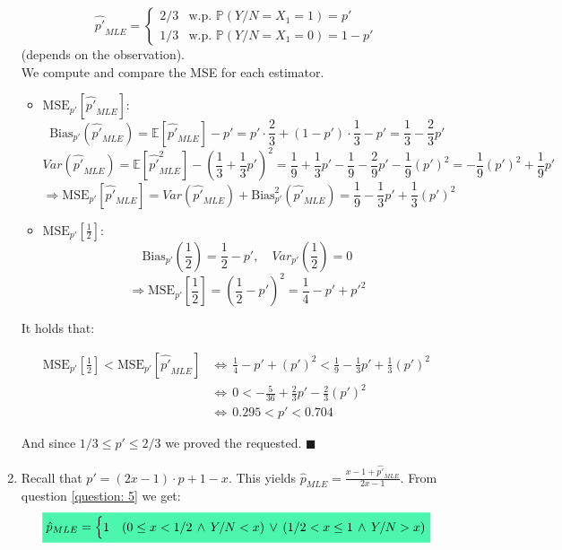\documentclass[../main.tex]{subfiles}
\begin{document}
\begin{enumerate}
    \[\hat{p'}_{MLE}=\begin{cases}
    2/3 & \text{w.p. } \mathbb{P}\left(Y/N=X_1=1\right)=p'\\
    1/3 & \text{w.p. }\mathbb{P}\left(Y/N=X_1=0\right)=1-p'
    \end{cases}\]
    (depends on the observation).\\
    We compute and compare the MSE for each estimator. 
    \begin{itemize}
        \item $\text{MSE}_{p'}[\hat{p'}_{MLE}]$:\\
        $$\text{Bias}_{p'}(\hat{p'}_{MLE})=\mathbb{E}\left[\hat{p'}_{MLE}\right]-p'=p'\cdot\frac{2}{3}+(1-p')\cdot\frac{1}{3}-p'=\frac{1}{3}-\frac{2}{3}p'$$
        $$Var\left(\hat{p'}_{MLE}\right)=\mathbb{E}\left[\hat{p'}_{MLE}^2\right]-\left(\frac{1}{3}+\frac{1}{3}p'\right)^2=\frac{1}{9}+\frac{1}{3}p'-\frac{1}{9}-\frac{2}{9}p'-\frac{1}{9}(p')^2=-\frac{1}{9}(p')^2+\frac{1}{9}p'$$
        $$\Longrightarrow \text{MSE}_{p'}[\hat{p'}_{MLE}]=Var(\hat{p'}_{MLE})+\text{Bias}^2_{p'}(\hat{p'}_{MLE})=\frac{1}{9}-\frac{1}{3}p'+\frac{1}{3}(p')^2$$
        \item $\text{MSE}_{p'}\left[\frac{1}{2}\right]:$\\
        $$\text{Bias}_{p'}\left(\frac{1}{2}\right)=\frac{1}{2}-p', \quad Var_{p'}\left(\frac{1}{2}\right)=0$$
        $$\Longrightarrow \text{MSE}_{p'}\left[\frac{1}{2}\right]= \left(\frac{1}{2}-p'\right)^2=\frac{1}{4}-p'+p'^2$$
    \end{itemize}
    It holds that:
    \begin{center}
        \begin{align*}
        \text{MSE}_{p'}\left[\frac{1}{2}\right]<\text{MSE}_{p'}\left[\hat{p'}_{MLE}\right] &\Longleftrightarrow\, \frac{1}{4}-p'+(p')^2<\frac{1}{9}-\frac{1}{3}p'+\frac{1}{3}(p')^2\\
        &\Longleftrightarrow\,0<-\frac{5}{36}+\frac{2}{3}p'-\frac{2}{3}(p')^2\\
        &\Longleftrightarrow\, 0.295<p'<0.704
        \end{align*}
    \end{center}
    And since $1/3\le p'\le 2/3$ we proved the requested. $\blacksquare$
    \item Recall that $p' = (2x-1)\cdot p+1-x$. This yields $\hat{p}_{MLE}= \frac{x-1+\hat{p'}_{MLE}}{2x-1}$. From question \ref{question: 5} we get:
    \[\mathcolorbox{goodcolor}{\hat{p}_{MLE}=\begin{cases}
    1 & \left(0\le x<1/2\, \land\, Y/N<x\right)\,\vee\,\left(1/2<x\le1\,\land \,Y/N>x\right) \\

\end{cases}}\]
\end{enumerate}
\end{document}
